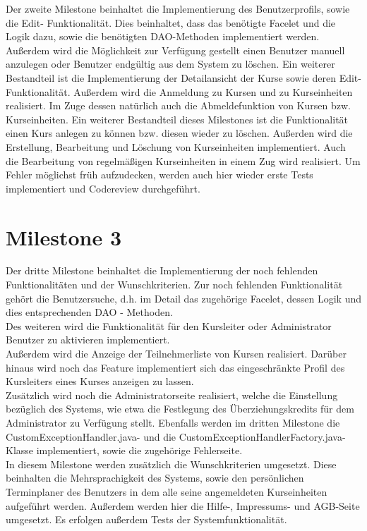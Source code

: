 Der zweite Milestone beinhaltet die Implementierung des Benutzerprofils, sowie die Edit-
Funktionalität. Dies beinhaltet, dass das benötigte Facelet und die Logik dazu, sowie die
benötigten DAO-Methoden implementiert werden.\\
Außerdem wird die Möglichkeit zur Verfügung gestellt einen Benutzer manuell anzulegen oder
Benutzer endgültig aus dem System zu löschen.
Ein weiterer Bestandteil ist die Implementierung der Detailansicht der Kurse sowie deren Edit-Funktionalität.
Außerdem wird die Anmeldung zu Kursen und zu Kurseinheiten realisiert. Im Zuge dessen natürlich auch die Abmeldefunktion von Kursen bzw. Kurseinheiten.
Ein weiterer Bestandteil dieses Milestones ist die Funktionalität einen Kurs anlegen zu können bzw. diesen wieder zu löschen. 
Außerden wird die Erstellung, Bearbeitung und Löschung von Kurseinheiten implementiert. Auch die Bearbeitung von regelmäßigen Kurseinheiten in einem Zug wird realisiert.
Um Fehler möglichst früh aufzudecken, werden auch hier wieder erste Tests implementiert
und Codereview durchgeführt.


\section{Milestone 3}

Der dritte Milestone beinhaltet die Implementierung der noch fehlenden Funktionalitäten und der Wunschkriterien.
Zur noch fehlenden Funktionalität gehört die Benutzersuche, d.h. im Detail das zugehörige Facelet, dessen Logik und dies entsprechenden DAO - Methoden. \\
Des weiteren wird die Funktionalität für den Kursleiter oder Administrator Benutzer zu aktivieren implementiert. \\
Außerdem wird die Anzeige der Teilnehmerliste von Kursen realisiert. Darüber hinaus wird noch das Feature implementiert sich das eingeschränkte Profil des Kursleiters eines Kurses anzeigen zu lassen. \\
Zusätzlich wird noch die Administratorseite realisiert, welche die  Einstellung bezüglich des Systems, wie etwa die Festlegung des Überziehungskredits für dem Administrator zu Verfügung stellt. 
Ebenfalls werden im dritten Milestone die CustomExceptionHandler.java- und die
CustomExceptionHandlerFactory.java-Klasse implementiert, sowie die zugehörige Fehlerseite.
\ \\
In diesem Milestone werden zusätzlich die Wunschkriterien umgesetzt. Diese beinhalten
die Mehrsprachigkeit des Systems, sowie den persönlichen Terminplaner des Benutzers in dem alle seine angemeldeten Kurseinheiten aufgeführt werden.
Außerdem werden hier die Hilfe-, Impressums- und AGB-Seite umgesetzt.
Es erfolgen außerdem Tests der Systemfunktionalität.

